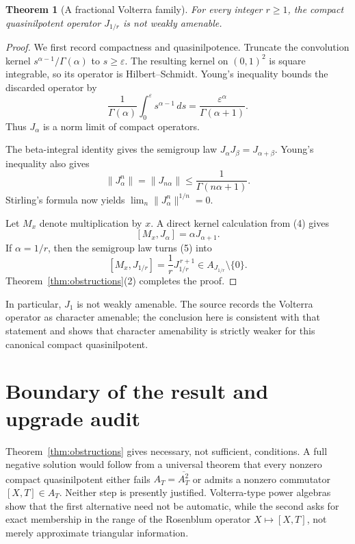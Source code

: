 \documentclass[11pt]{article}
\newtheorem{theorem}{Theorem}
\newcommand{\AT}{A_T}
\begin{document}
\begin{theorem}[A fractional Volterra family]
\label{thm:RL}
For every integer \(r\ge1\), the compact quasinilpotent operator
\(J_{1/r}\) is not weakly amenable.
\end{theorem}

\begin{proof}
We first record compactness and quasinilpotence.  Truncate the convolution
kernel \(s^{\alpha-1}/\Gamma(\alpha)\) to \(s\ge\varepsilon\).  The
resulting kernel on \((0,1)^2\) is square integrable, so its operator is
Hilbert--Schmidt.  Young's inequality bounds the discarded operator by
\[
 \frac1{\Gamma(\alpha)}\int_0^\varepsilon s^{\alpha-1}\,ds
 =\frac{\varepsilon^\alpha}{\Gamma(\alpha+1)}.
\]
Thus \(J_\alpha\) is a norm limit of compact operators.

The beta-integral identity gives the semigroup law
\(J_\alpha J_\beta=J_{\alpha+\beta}\).  Young's inequality also gives
\[
 \|J_\alpha^n\|=\|J_{n\alpha}\|
 \le \frac1{\Gamma(n\alpha+1)}.
\]
Stirling's formula now yields
\(\lim_n\|J_\alpha^n\|^{1/n}=0\).

Let \(M_x\) denote multiplication by \(x\).  A direct kernel calculation
from (4) gives
\[
 [M_x,J_\alpha]=\alpha J_{\alpha+1}. \tag{5}
\]
If \(\alpha=1/r\), then the semigroup law turns (5) into
\[
 [M_x,J_{1/r}]=\frac1r J_{1/r}^{\,r+1}
 \in A_{J_{1/r}}\setminus\{0\}.
\]
Theorem~\ref{thm:obstructions}(2) completes the proof.
\end{proof}

In particular, \(J_1\) is not weakly amenable.  The source records the
Volterra operator as character amenable; the conclusion here is consistent
with that statement and shows that character amenability is strictly weaker
for this canonical compact quasinilpotent.

\section{Boundary of the result and upgrade audit}

Theorem~\ref{thm:obstructions} gives necessary, not sufficient, conditions.
A full negative solution would follow from a universal theorem that every
nonzero compact quasinilpotent either fails
\(\AT=\overline{\AT^2}\) or admits a nonzero commutator
\([X,T]\in\AT\).  Neither step is presently justified.  Volterra-type
power algebras show that the first alternative need not be automatic, while
the second asks for exact membership in the range of the Rosenblum operator
\(X\mapsto[X,T]\), not merely approximate triangular information.
\end{document}
